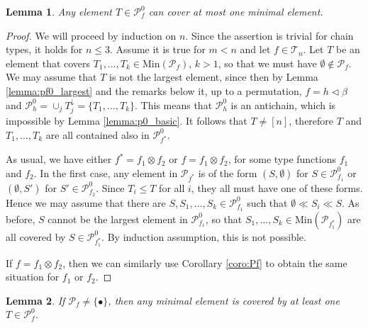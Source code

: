 \documentclass[12pt]{article}
\newtheorem{lemma}{Lemma}
\theoremstyle{definition}
\theoremstyle{remark}
\def\cover{\ll}
\def\Te{\mathcal T}
\def\Pe{\mathcal P}
\def\vtl{\vartriangleleft}
\begin{document}
\begin{lemma}\label{lemma:pf0_covermin} Any element $T\in \Pe_f^0$ can cover at most one
minimal element. 

\end{lemma}

\begin{proof} We will proceed by induction on $n$. Since the assertion is trivial for
chain types, it holds for $n\le 3$. Assume it is true for $m<n$ and let $f\in \Te_n$. Let
$T$ be an element that covers $T_1,\dots, T_k\in \mathrm{Min}(\Pe_f)$, $k>1$, so that we must have  $\emptyset \notin \Pe_f$. 
 We may
assume that $T$ is not the largest element, since then by Lemma \ref{lemma:pf0_largest}
and the remarks below it, up to a permutation, $f=h\vtl \beta$ and $\Pe_h^0=\cup_j
T_j^{\downarrow}=\{T_1,\dots, T_k\}$. This means that $\Pe_h^0$ is an antichain,
which is impossible by Lemma \ref{lemma:p0_basic}. It follows that $T\ne
[n]$, therefore $T$  and $T_1,\dots,
T_k$ are all contained also
in $\Pe_{f^*}^0$. 

As usual, we have either $f^*=f_1\otimes f_2$ or $f=f_1\otimes f_2$, for some type
functions $f_1$ and $f_2$.  In the first case, any element in $\Pe_{f^*}$ is of the form
$(S,\emptyset)$ for $S\in \Pe_{f_1}^0$ or $(\emptyset, S')$ for $S'\in \Pe_{f_2}^0$. Since 
$T_i\le T$ for all $i$, they all must have one of these forms. Hence we may assume that there are
$S, S_1,\dots,S_k\in \Pe_{f_1}^0$ such that $\emptyset \cover S_i \cover S$. As before, $S$
cannot be the largest element in $\Pe_{f_1}^0$, so that $S_1,\dots,S_k\in
\mathrm{Min}(\Pe_{f_1^*})$ are all covered by $S\in \Pe_{f_1^*}^0$. By induction
assumption, this is not possible.

If $f=f_1\otimes f_2$, then we can similarly use Corollary \ref{coro:Pf} to obtain the
same situation for $f_1$ or $f_2$.

\end{proof}

\begin{lemma}\label{lemma:pf0_mincover} If $\Pe_f\neq \{\bullet\}$, then any minimal element is covered by at least one $T\in \Pe_f^0$.

\end{lemma}
\end{document}
